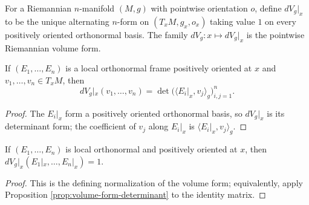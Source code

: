 \begin{definition}
\label{def:volume-form-pointwise}





For a Riemannian $n$-manifold $(M,g)$ with pointwise orientation $o$, define $dV_g|_x$ to be the unique alternating $n$-form on $(T_xM,g_x,o_x)$ taking value $1$ on every positively oriented orthonormal basis. The family $dV_g:x\mapsto dV_g|_x$ is the pointwise Riemannian volume form.
\end{definition}

\begin{proposition}
\label{prop:volume-form-determinant}





If $(E_1,\ldots,E_n)$ is a local orthonormal frame positively oriented at $x$ and $v_1,\ldots,v_n\in T_xM$, then
\[
dV_g|_x(v_1,\ldots,v_n)=\det\bigl(\langle E_i|_x,v_j\rangle_g\bigr)_{i,j=1}^n.
\]
\end{proposition}

\begin{proof}

\sketch The $E_i|_x$ form a positively oriented orthonormal basis, so $dV_g|_x$ is its determinant form; the coefficient of $v_j$ along $E_i|_x$ is $\langle E_i|_x,v_j\rangle_g$.
\end{proof}

\begin{proposition}
\label{prop:volume-form-value-one}





If $(E_1,\ldots,E_n)$ is local orthonormal and positively oriented at $x$, then $dV_g|_x(E_1|_x,\ldots,E_n|_x)=1$.
\end{proposition}

\begin{proof}

\sketch This is the defining normalization of the volume form; equivalently, apply Proposition \ref{prop:volume-form-determinant} to the identity matrix.
\end{proof}


